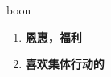 
\begin{frame}
{\huge boon}
\begin{center}
\begin{enumerate}\Large
  \item \textbf{恩惠，福利}
  \item \textbf{喜欢集体行动的}
\end{enumerate}
\end{center}
\end{frame}

